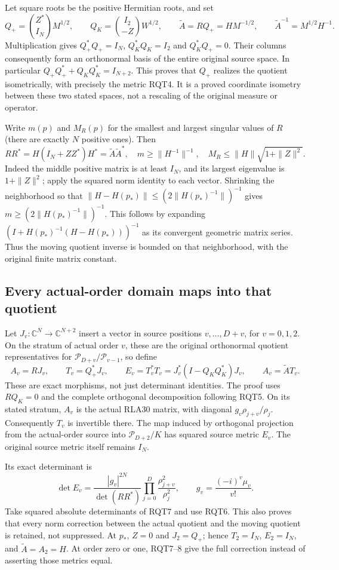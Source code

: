 \documentclass[11pt]{article}
\begin{document}
Let square roots be the positive Hermitian roots, and set
\[
 Q_+=\binom{Z^*}{I_N}M^{1/2},\qquad
 Q_K=\binom{I_2}{-Z}W^{1/2},\qquad
 \widetilde A=RQ_+=HM^{-1/2},\qquad
 \widetilde A^{-1}=M^{1/2}H^{-1}.
 \tag{RQT5}
\]
Multiplication gives $Q_+^*Q_+=I_N$, $Q_K^*Q_K=I_2$ and
$Q_K^*Q_+=0$.  Their columns consequently form an orthonormal
basis of the entire original source space.  In particular
$Q_+Q_+^*+Q_KQ_K^*=I_{N+2}$.  This proves that $Q_+$ realizes
the quotient isometrically, with precisely the metric RQT4.
It is a proved coordinate isometry between these two stated
spaces, not a rescaling of the original measure or operator.

Write $m(p)$ and $M_R(p)$ for the smallest and largest singular
values of $R$ (there are exactly $N$ positive ones).  Then
\[
 RR^*=H(I_N+ZZ^*)H^*=\widetilde A\widetilde A^*,\quad
 m\ge\|H^{-1}\|^{-1},\quad
 M_R\le\|H\|\sqrt{1+\|Z\|^2}.
 \tag{RQT6}
\]
Indeed the middle positive matrix is at least $I_N$, and its
largest eigenvalue is $1+\|Z\|^2$; apply the squared norm
identity to each vector.  Shrinking the neighborhood so that
$\|H-H(p_*)\|\le(2\|H(p_*)^{-1}\|)^{-1}$ gives
$m\ge(2\|H(p_*)^{-1}\|)^{-1}$.  This follows by expanding
$(I+H(p_*)^{-1}(H-H(p_*)))^{-1}$ as its convergent geometric
matrix series.  Thus the moving quotient inverse is bounded
on that neighborhood, with the original finite matrix constant.

\subsection{Every actual-order domain maps into that quotient}
Let $J_v:\mathbb C^N\to\mathbb C^{N+2}$ insert a vector in
source positions $v,\ldots,D+v$, for $v=0,1,2$.
On the stratum of actual order $v$, these are the original
orthonormal quotient representatives for
$\mathcal P_{D+v}/\mathcal P_{v-1}$, so define
\[
 A_v=RJ_v,\qquad T_v=Q_+^*J_v,\qquad E_v=T_v^*T_v
 =J_v^*(I-Q_KQ_K^*)J_v,\qquad A_v=\widetilde A T_v.
 \tag{RQT7}
\]
These are exact morphisms, not just determinant identities.
The proof uses $RQ_K=0$ and the complete orthogonal decomposition
following RQT5.  On its stated stratum, $A_v$ is the actual
RLA30 matrix, with diagonal $g_v\rho_{j+v}/\rho_j$.
Consequently $T_v$ is invertible there.  The map induced by
orthogonal projection from the actual-order source into
$\mathcal P_{D+2}/K$ has squared source metric $E_v$.
The original source metric itself remains $I_N$.

Its exact determinant is
\[
 \det E_v=\frac{|g_v|^{2N}}{\det(RR^*)}
       \prod_{j=0}^D\frac{\rho_{j+v}^2}{\rho_j^2},\qquad
 g_v=\frac{(-i)^v\mu_v}{v!}.
 \tag{RQT8}
\]
Take squared absolute determinants of RQT7 and use RQT6.
This also proves that every norm correction between the actual
quotient and the moving quotient is retained, not suppressed.
At $p_*$, $Z=0$ and $J_2=Q_+$; hence $T_2=I_N$, $E_2=I_N$,
and $\widetilde A=A_2=H$.  At order zero or one, RQT7--8
give the full correction instead of asserting those metrics equal.
\end{document}
